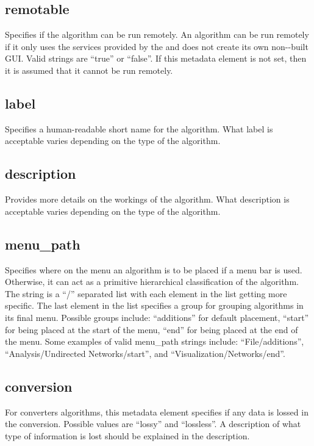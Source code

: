 \subsection*{remotable}
Specifies if the algorithm can be run remotely. An algorithm can be run
remotely if it only uses the services provided by the 
and does not create its own non--built GUI. Valid
strings are ``true'' or ``false''. If this metadata element is not set, then
it is assumed that it cannot be run remotely.

\subsection*{label}
Specifies a human-readable short name for the algorithm. What label is
acceptable varies depending on the type of the algorithm. 

\subsection*{description}
Provides more details on the workings of the algorithm. What
description is acceptable varies depending on the type of the algorithm.

\subsection*{menu\_path}
Specifies where on the menu an algorithm is to be
placed if a menu bar is used. Otherwise, it can act as a primitive hierarchical
classification of the algorithm. The string is a ``/'' separated list with
each element in the list getting more specific. The last element in the list
specifies a group for grouping algorithms in its final menu. Possible groups
include: ``additions'' for default placement, ``start'' for being placed at
the start of the menu, ``end'' for being placed at the end of the menu. Some
examples of valid menu\_path strings include: ``File/additions'',
``Analysis/Undirected Networks/start'', and ``Visualization/Networks/end''.

\subsection*{conversion}
For converters algorithms, this metadata element specifies if any data is
lossed in the conversion. Possible values are ``lossy'' and ``lossless''. A
description of what type of information is lost should be explained in the
description.

